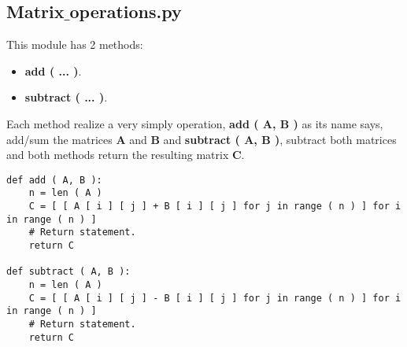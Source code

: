 \subsection{Matrix$\_$operations.py}

This module has 2 methods: 

\begin{itemize}
\item {\bfseries add ( ... )}.
\item {\bfseries subtract ( ... )}.
\end{itemize} 

Each method realize a very simply operation, {\bfseries add ( A, B )} as its name says, add/sum the matrices {\bfseries A} and {\bfseries B} and {\bfseries subtract ( A, B )}, subtract both matrices and both methods return the resulting matrix {\bfseries C}.  \hfill \break

\begin{lstlisting}
def add ( A, B ):
    n = len ( A )
    C = [ [ A [ i ] [ j ] + B [ i ] [ j ] for j in range ( n ) ] for i in range ( n ) ]
    # Return statement.
    return C

def subtract ( A, B ):
    n = len ( A )
    C = [ [ A [ i ] [ j ] - B [ i ] [ j ] for j in range ( n ) ] for i in range ( n ) ]
    # Return statement.
    return C
\end{lstlisting}

\pagebreak
